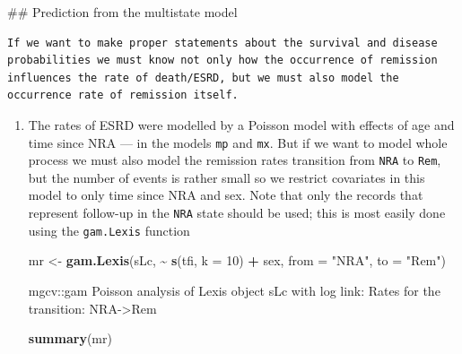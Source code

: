 \documentclass[
]{book}
\newenvironment{Shaded}{\begin{snugshade}}{\end{snugshade}}
\newcommand{\AttributeTok}[1]{\textcolor[rgb]{0.13,0.29,0.53}{#1}}
\newcommand{\DecValTok}[1]{\textcolor[rgb]{0.00,0.00,0.81}{#1}}
\newcommand{\FunctionTok}[1]{\textcolor[rgb]{0.13,0.29,0.53}{\textbf{#1}}}
\newcommand{\NormalTok}[1]{#1}
\newcommand{\OtherTok}[1]{\textcolor[rgb]{0.56,0.35,0.01}{#1}}
\newcommand{\SpecialCharTok}[1]{\textcolor[rgb]{0.81,0.36,0.00}{\textbf{#1}}}
\newcommand{\StringTok}[1]{\textcolor[rgb]{0.31,0.60,0.02}{#1}}
\begin{document}
\#\# Prediction from the multistate model

\begin{verbatim}
If we want to make proper statements about the survival and disease
probabilities we must know not only how the occurrence of remission
influences the rate of death/ESRD, but we must also model the
occurrence rate of remission itself.
\end{verbatim}

\begin{enumerate}
\def\labelenumi{\arabic{enumi}.}
\setcounter{enumi}{16}
\item
  The rates of ESRD were modelled by a Poisson model with
  effects of age and time since NRA --- in the models \texttt{mp}
  and \texttt{mx}. But if we want to model whole process we must
  also model the remission rates transition from \texttt{NRA} to
  \texttt{Rem}, but the number of events is rather small so we restrict
  covariates in this model to only time since NRA and sex. Note
  that only the records that represent follow-up in the \texttt{NRA}
  state should be used; this is most easily done using the
  \texttt{gam.Lexis} function

\begin{Shaded}
\begin{Highlighting}[]
\NormalTok{mr }\OtherTok{\textless{}{-}} \FunctionTok{gam.Lexis}\NormalTok{(sLc, }\SpecialCharTok{\textasciitilde{}} \FunctionTok{s}\NormalTok{(tfi, }\AttributeTok{k =} \DecValTok{10}\NormalTok{) }\SpecialCharTok{+}\NormalTok{ sex,}
                     \AttributeTok{from =} \StringTok{"NRA"}\NormalTok{,}
                       \AttributeTok{to =} \StringTok{"Rem"}\NormalTok{)}
\end{Highlighting}
\end{Shaded}

\begin{Shaded}
\begin{Highlighting}[]
\NormalTok{mgcv::gam Poisson analysis of Lexis object sLc with log link:}
\NormalTok{Rates for the transition:}
\NormalTok{NRA{-}\textgreater{}Rem}
\end{Highlighting}
\end{Shaded}

\begin{Shaded}
\begin{Highlighting}[]
\FunctionTok{summary}\NormalTok{(mr)}
\end{Highlighting}
\end{Shaded}


\end{enumerate}
\end{document}
